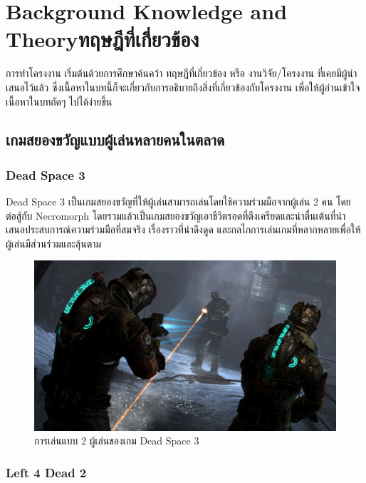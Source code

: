 \chapter{\ifenglish Background Knowledge and Theory\else ทฤษฎีที่เกี่ยวข้อง\fi}

การทำโครงงาน เริ่มต้นด้วยการศึกษาค้นคว้า ทฤษฎีที่เกี่ยวข้อง หรือ งานวิจัย/โครงงาน ที่เคยมีผู้นำเสนอไว้แล้ว ซึ่งเนื้อหาในบทนี้ก็จะเกี่ยวกับการอธิบายถึงสิ่งที่เกี่ยวข้องกับโครงงาน เพื่อให้ผู้อ่านเข้าใจเนื้อหาในบทถัดๆ ไปได้ง่ายขึ้น

\section{เกมสยองขวัญแบบผู้เล่นหลายคนในตลาด}
\subsection{Dead Space 3}

Dead Space 3 เป็นเกมสยองขวัญที่ให้ผู้เล่นสามารถเล่นโดยใช้ความร่วมมือจากผู้เล่น 2 คน โดยต่อสู้กับ Necromorph โดยรวมแล้วเป็นเกมสยองขวัญเอาชีวิตรอดที่ตึงเครียดและน่าตื่นเต้นที่นำเสนอประสบการณ์ความร่วมมือที่สมจริง เรื่องราวที่น่าดึงดูด และกลไกการเล่นเกมที่หลากหลายเพื่อให้ผู้เล่นมีส่วนร่วมและลุ้นตาม \cite{DeadSpace3}

\begin{figure}[h]
  \begin{center}
  \includegraphics[width=\textwidth]{./img/deadspace3.jpg}
  \end{center}
  \caption[ภาพเกม Dead Space 3]{การเล่นแบบ 2 ผู้เล่นของเกม Dead Space 3}
  \label{fig:DeadSpace3}
\end{figure}

\subsection{Left 4 Dead 2}

